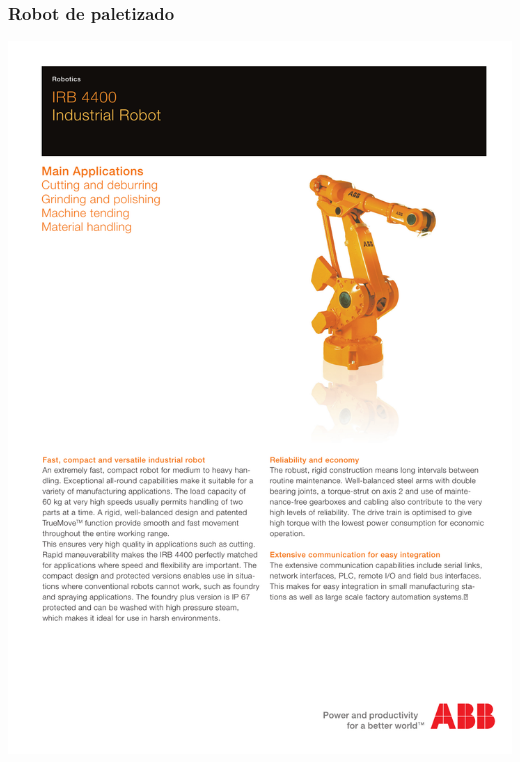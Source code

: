 \subsubsection{Robot de paletizado}
\hspace*{-2cm}
\includegraphics[page=2]{Datasheets/IRB-4400.pdf}
\newpage
